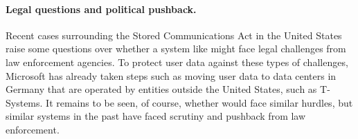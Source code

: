 
\paragraph{Legal questions and political pushback.} Recent cases surrounding
the Stored Communications Act in the United States raise some questions over
whether a system like \system{} might face legal challenges from law
enforcement agencies. To protect user data against these types of challenges,
Microsoft has already taken steps such as moving user data to data centers in
Germany that are operated by entities outside the United States, such as
T-Systems. It remains to be seen, of course, whether \system{} would face similar
hurdles, but similar systems in the past have faced scrutiny and pushback from law
enforcement.
